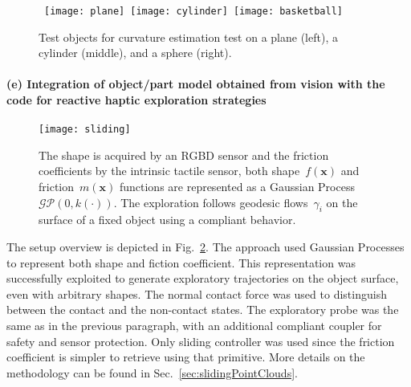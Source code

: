 \begin{figure}[!h]
    \centering
    \label{fig:curvature}
    \mbox{
    \texttt{[image: plane]}
    \texttt{[image: cylinder]}
    \texttt{[image: basketball]}
    }
    \caption{Test objects for curvature estimation test on a plane (left), a cylinder (middle), and a sphere (right).}
    \vspace{9pt}
\end{figure}



\paragraph{(e) Integration of object/part model obtained from vision with the code for reactive haptic exploration strategies}

\begin{figure}[!b]
  \begin{center}
    \texttt{[image: sliding]}
  \end{center}
  \caption{The shape is acquired by an RGBD sensor and the friction coefficients by the intrinsic tactile sensor, both shape~$f(\mathbf{x})$ and friction~$m(\mathbf{x})$ functions are represented as a Gaussian Process $\mathcal{GP}(0,k(\cdot))$. The exploration follows geodesic flows~$\gamma_i$ on the surface of a fixed object using a compliant behavior.}
  \label{fig:schema}
\end{figure}

The setup overview is depicted in Fig.~\ref{fig:schema}. The approach used Gaussian Processes to represent both shape and fiction coefficient. This representation was successfully exploited to generate exploratory trajectories on the object surface, even with arbitrary shapes. The normal contact force was used to distinguish between the contact and the non-contact states. The exploratory probe was the same as in the previous paragraph, with an additional compliant coupler for safety and sensor protection. Only sliding controller was used since the friction coefficient is simpler to retrieve using that primitive. More details on the methodology can be found in Sec.~\ref{sec:slidingPointClouds}.%


